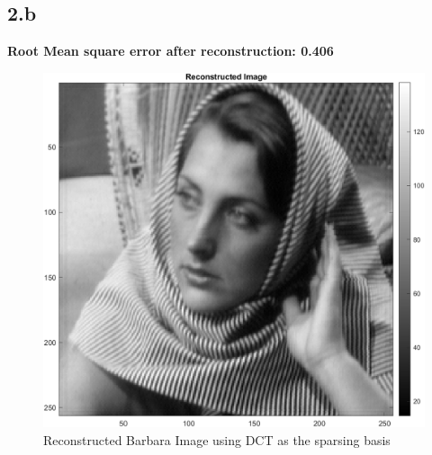 \documentclass[12pt]{article}
\begin{document}
\subsection*{2.b}
\textbf{Root Mean square error after reconstruction: 0.406}
\begin{figure}[H]
  \centering
  \includegraphics[scale=0.4]{rec_dct.png}  %
  \caption{Reconstructed Barbara Image using DCT as the sparsing basis}
  \label{fig:3}
\end{figure}
\end{document}
